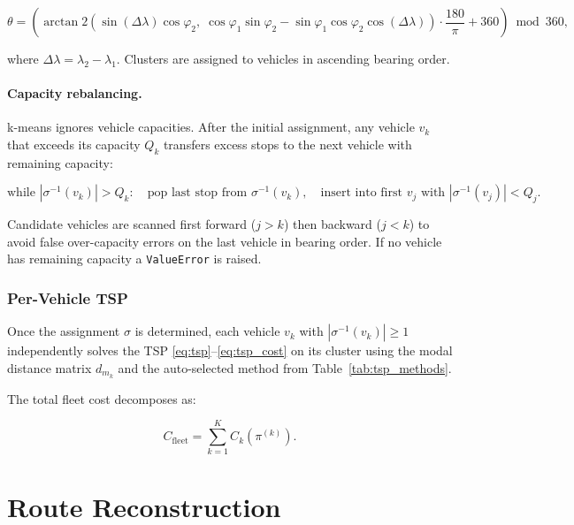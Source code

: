 \documentclass[12pt, a4paper]{article}
\theoremstyle{definition}
\begin{document}
\begin{equation}
  \label{eq:bearing}
  \theta = \left(
    \arctan2\!\left(
      \sin(\Delta\lambda)\cos\varphi_2,\;
      \cos\varphi_1 \sin\varphi_2 - \sin\varphi_1 \cos\varphi_2 \cos(\Delta\lambda)
    \right) \cdot \frac{180}{\pi} + 360
  \right) \bmod 360,
\end{equation}

\noindent where $\Delta\lambda = \lambda_2 - \lambda_1$.  Clusters are
assigned to vehicles in ascending bearing order.

\paragraph{Capacity rebalancing.}
k-means ignores vehicle capacities.  After the initial assignment, any
vehicle $v_k$ that exceeds its capacity $Q_k$ transfers excess stops to the
next vehicle with remaining capacity:

\begin{equation}
  \label{eq:rebalance}
  \text{while } |\sigma^{-1}(v_k)| > Q_k :
  \quad\text{pop last stop from } \sigma^{-1}(v_k),
  \quad\text{insert into first } v_j \text{ with } |\sigma^{-1}(v_j)| < Q_j.
\end{equation}

Candidate vehicles are scanned first forward ($j > k$) then backward ($j < k$)
to avoid false over-capacity errors on the last vehicle in bearing order.
If no vehicle has remaining capacity a \texttt{ValueError} is raised.

\subsubsection{Per-Vehicle TSP}

Once the assignment $\sigma$ is determined, each vehicle $v_k$ with
$|\sigma^{-1}(v_k)| \geq 1$ independently solves the TSP
\eqref{eq:tsp}--\eqref{eq:tsp_cost} on its cluster using the modal distance
matrix $d_{m_k}$ and the auto-selected method from Table~\ref{tab:tsp_methods}.

The total fleet cost decomposes as:

\begin{equation}
  \label{eq:fleet_cost}
  C_{\text{fleet}} = \sum_{k=1}^{K} C_k(\pi^{(k)}).
\end{equation}

\section{Route Reconstruction}
\end{document}
